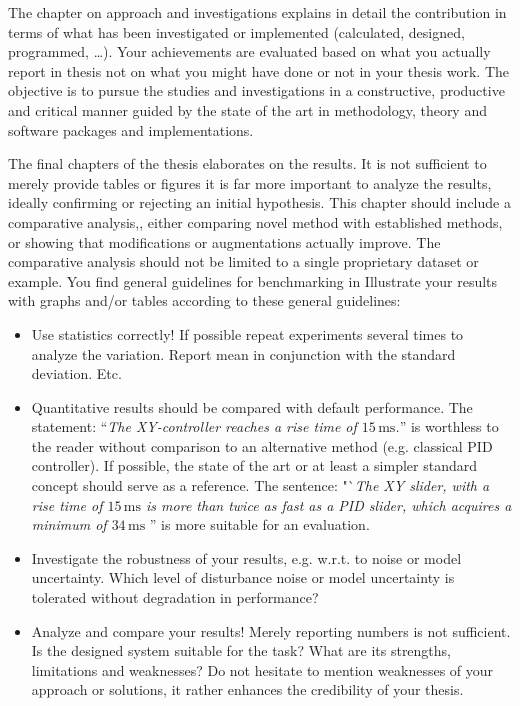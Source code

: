 The chapter on approach and investigations explains in detail the contribution in terms of what has been investigated or implemented (calculated, designed, programmed, \ldots).
Your achievements are evaluated based on what you actually report in thesis not on what you might have done or not in your thesis work.
The objective is to pursue the studies and investigations in a constructive, productive and critical manner guided by the state of the art in methodology, theory and software packages and implementations. 

The final chapters of the thesis elaborates on the results. It is not sufficient to merely
provide tables or figures it is far more important to analyze the results, ideally confirming or rejecting an initial hypothesis. This chapter should include a comparative analysis,,
either comparing novel method with established methods, or showing that modifications or augmentations actually improve. The comparative analysis should not be limited to a single proprietary dataset or example. You find general guidelines for benchmarking in \cite{Hoff2019}  
Illustrate your results with graphs and/or tables according to these
general guidelines:

\begin{itemize}
	\item Use statistics correctly! If possible repeat experiments several times to analyze the variation. Report mean in conjunction with the standard deviation. Etc.
	\item Quantitative results should be compared with default performance. The statement: "`\emph{The XY-controller reaches a rise time of $15\,\mathrm{ms}$.}"' is worthless to the reader without comparison to an alternative method (e.g. classical PID controller). If possible, the state of the art or at least a simpler standard concept should serve as a reference. The sentence: "`\emph{The XY slider, with a rise time of $15\,\mathrm{ms}$ is more than twice as fast as a PID slider, which acquires a minimum of $34\,\mathrm{ms}$ } '' is more suitable for an evaluation.
	\item Investigate the robustness of your results, e.g. w.r.t. to noise or model uncertainty. Which level of disturbance noise or model uncertainty is tolerated without degradation in performance?
	\item Analyze and compare your results! Merely reporting numbers is not sufficient. Is the designed system suitable for the task? What are its strengths, limitations and weaknesses? Do not hesitate to mention weaknesses of your approach or solutions, it rather enhances the credibility of your thesis.
\end{itemize}

